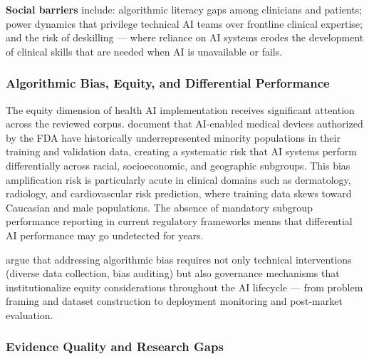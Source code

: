 \textbf{Social barriers} include: algorithmic literacy gaps among clinicians
and patients; power dynamics that privilege technical AI teams over
frontline clinical expertise; and the risk of deskilling — where reliance
on AI systems erodes the development of clinical skills that are needed
when AI is unavailable or fails.


\subsubsection{Algorithmic Bias, Equity, and Differential Performance}
\label{sec:impl_equity}

The equity dimension of health AI implementation receives significant
attention across the reviewed corpus. \citet{abulibdeh2025illusion} document
that AI-enabled medical devices authorized by the FDA have historically
underrepresented minority populations in their training and validation data,
creating a systematic risk that AI systems perform differentially across
racial, socioeconomic, and geographic subgroups. This bias amplification
risk is particularly acute in clinical domains such as dermatology, radiology,
and cardiovascular risk prediction, where training data skews toward
Caucasian and male populations. The absence of mandatory subgroup performance
reporting in current regulatory frameworks means that differential AI
performance may go undetected for years.

\citet{pham2025ethical} argue that addressing algorithmic bias requires not
only technical interventions (diverse data collection, bias auditing) but
also governance mechanisms that institutionalize equity considerations
throughout the AI lifecycle — from problem framing and dataset construction
to deployment monitoring and post-market evaluation.


\subsubsection{Evidence Quality and Research Gaps}
\label{sec:impl_gaps}

